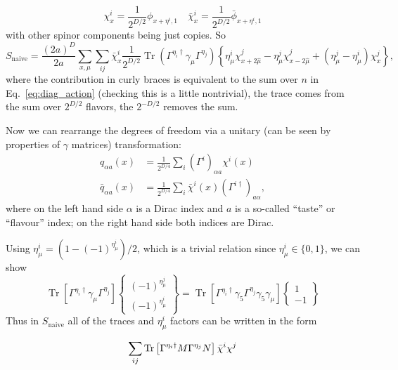 \begin{equation}
\chi_{x}^{i}=\frac{1}{2^{D / 2}} \phi_{x+\eta^i,1} \quad \bar{\chi}_{x}^{i}=\frac{1}{2^{D / 2}} \bar{\phi}_{x+\eta^i, 1}
\end{equation}
with other spinor components being just copies.
So
\begin{equation}
    S_\text{naive} = \frac{(2a)^D}{2a}\sum_{x,\mu}\sum_{ij}\bar{\chi}^i_x \frac{1}{2^{D/2}}\operatorname{Tr}(\Gamma^{\eta_i \dagger}\gamma_\mu \Gamma^{\eta_j}) \left\{ \eta_\mu^i \chi_{x + 2 \hat{\mu}}^j - \eta_\mu^j \chi^j_{x - 2\hat{\mu}}+ (\eta^j_\mu - \eta^i_\mu)\chi_x^j \right\},
\end{equation}
where the contribution in curly braces is equivalent to the sum over $n$ in Eq.~\eqref{eq:diag_action} (checking this is a little nontrivial), the trace comes from the sum over $2^{D/2}$ flavors, the $2^{-D/2}$ removes the sum.

Now we can rearrange the degrees of freedom via a unitary (can be seen by properties of $\gamma$ matrices) transformation:
\begin{align}
    q_{\alpha a}(x) &= \frac{1}{2^{D/4}}\sum_i (\Gamma^i)_{\alpha a}\chi^i(x) \nonumber \\
    \bar{q}_{\alpha a}(x) &= \frac{1}{2^{D/4}}\sum_i \bar{\chi}^i(x)(\Gamma^{i \dagger})_{a \alpha},
\end{align}
where on the left hand side $\alpha$ is a Dirac index and $a$ is a so-called ``taste'' or ``flavour'' index; on the right hand side both indices are Dirac.

Using $\eta_\mu^i = (1 - (-1)^{\eta^i_\mu})/2$, which is a trivial relation since $\eta_\mu^i \in \{ 0,1\}$, we can show
\begin{equation}
    \operatorname{Tr}[\Gamma^{\eta_i \dagger} \gamma_\mu \Gamma^{\eta_j}] \left\{ \begin{array}{cc}
         (-1)^{\eta^j_\mu}  \\
         (-1)^{\eta^i_\mu}
    \end{array}\right\} = \operatorname{Tr}[\Gamma^{\eta_i \dagger} \gamma_5  \Gamma^{\eta_j}\gamma_5\gamma_\mu]\left\{ \begin{array}{cc}
         1 \\
         -1
    \end{array}\right\}
\end{equation}
Thus in $S_\text{naive}$ all of the traces and $\eta_\mu^i$ factors can be written in the form

\begin{equation}
\sum_{i j} {\rm Tr}\left[\Gamma^{\eta_{i}\dagger} M \Gamma^{\eta_{j}} N\right] \bar{\chi}^{i} \chi^{j}
\end{equation}

